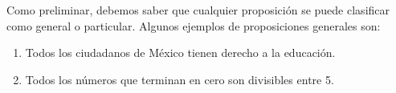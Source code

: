 Como preliminar, debemos saber que cualquier proposición se puede clasificar como general o particular. Algunos ejemplos de proposiciones generales son:
\begin{enumerate}
    \item Todos los ciudadanos de México tienen derecho a la educación.
    \item Todos los números que terminan en cero son divisibles entre 5.
\end{enumerate}

\newpage
{}

